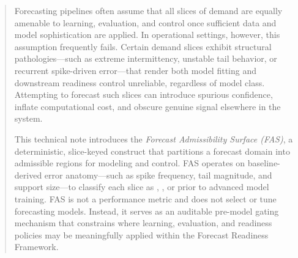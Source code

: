 
\begin{abstract}
Forecasting pipelines often assume that all slices of demand are equally amenable to learning,
evaluation, and control once sufficient data and model sophistication are applied. In operational
settings, however, this assumption frequently fails. Certain demand slices exhibit structural
pathologies—such as extreme intermittency, unstable tail behavior, or recurrent spike-driven
error—that render both model fitting and downstream readiness control unreliable, regardless of
model class. Attempting to forecast such slices can introduce spurious confidence, inflate
computational cost, and obscure genuine signal elsewhere in the system.

This technical note introduces the \emph{Forecast Admissibility Surface (FAS)}, a deterministic,
slice-keyed construct that partitions a forecast domain into admissible regions for modeling and
control. FAS operates on baseline-derived error anatomy—such as spike frequency, tail magnitude,
and support size—to classify each slice as \Allowed, \Conditional, or \Blocked prior to advanced
model training. FAS is not a performance metric and does not select or tune forecasting models.
Instead, it serves as an auditable pre-model gating mechanism that constrains where learning,
evaluation, and readiness policies may be meaningfully applied within the Forecast Readiness
Framework.
\end{abstract}
